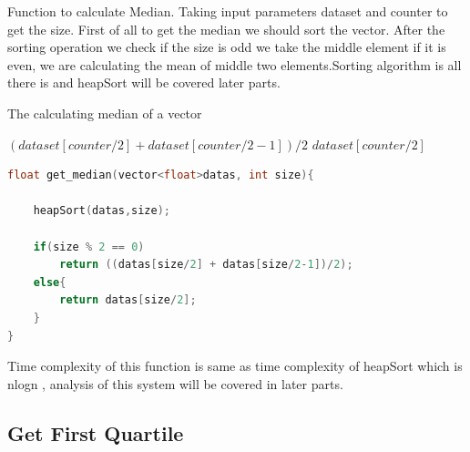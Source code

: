 \documentclass[a4paper, 12pt, titlepage]{article}
\begin{document}
    Function to calculate Median. Taking input parameters dataset and counter to get the size. First of all to get the median we should sort the vector. After the sorting operation we check if the size is odd we take the middle element if it is even, we are calculating the mean of middle two elements.Sorting algorithm is all there is and heapSort will be covered later parts.
\begin{algorithm}[H]
	\caption{The calculating median of a vector}
	\label{algo:dfs}
	\begin{algorithmic}

		
            \State {} 

                    \State \Return $ (dataset[counter/2] + dataset[counter/2-1])/2 $
                \EndIf
		          \State \Return $ dataset[counter/2] $
                \EndIf
	\EndFunction
	\end{algorithmic}
\end{algorithm}
    
\usepackage{\textbf{Code for Get Median}}
\begin{lstlisting}[language=C++]
float get_median(vector<float>datas, int size){         
    
    heapSort(datas,size);                               
    
    if(size % 2 == 0)                                   
        return ((datas[size/2] + datas[size/2-1])/2);
    else{
        return datas[size/2];
    }
}
\end{lstlisting}
Time complexity of this function is same as time complexity of heapSort which is nlogn , analysis of this system will be covered in later parts.

\newpage

\subsection{Get First Quartile}
\end{document}
